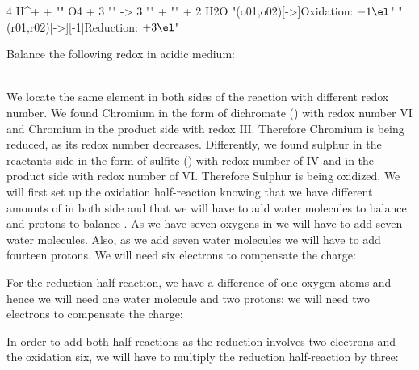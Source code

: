 \documentclass[main.tex]{subfiles}
\begin{document}
\begin{description}
\vspace{0.5cm}
 \begin{reaction*}
  4 H^+\aq{} + "" O4 \aq{} + 3 "" \aq{} 
    ->
  3 "" \aq{} +  "" \aq{} + 2 H2O\lqd{}
  "\redox(o01,o02)[->]{\small Oxidation: $- 1\el$}"
  "\redox(r01,r02)[->][-1]{\small Reduction: $+ 3\el$}"
\end{reaction*}\vspace{0.5cm}
\begin{example} %
Balance the following redox in acidic medium:
\begin{center}\end{center}
\\
We locate the same element in both sides of the reaction with different redox number. We found Chromium in the form of dichromate () with redox number $\text{VI}$ and Chromium in the product side with redox $\text{III}$. Therefore Chromium is being reduced, as its redox number decreases. Differently, we found sulphur in the reactants side in the form of sulfite () with redox number of $\text{IV}$ and in the product side with redox number of $\text{VI}$. Therefore Sulphur is being oxidized. We will first set up the oxidation half-reaction knowing that we have different amounts of  in both side and that we will have to add water molecules to balance  and protons to balance  . As we have seven oxygens in  we will have to add seven water molecules. Also, as we add seven water molecules we will have to add fourteen protons. We will need six electrons to compensate the charge:
\begin{center}\end{center}
For the reduction half-reaction, we have a difference of one oxygen atoms and hence we will need one water molecule and two protons; we will need two electrons to compensate the charge:
\begin{center}\end{center}
In order to add both half-reactions as the reduction involves two electrons and the oxidation six, we will have to multiply the reduction half-reaction by three:
 \begin{center}

\end{center}
\end{example}
\end{description}
\end{document}
